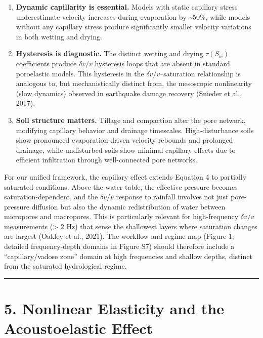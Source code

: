 \documentclass[draft]{agujournal2019}
\begin{document}
\begin{enumerate}
\def\labelenumi{\arabic{enumi}.}
\item
  \textbf{Dynamic capillarity is essential.} Models with static
  capillary stress underestimate velocity increases during evaporation
  by \textasciitilde{}50\%, while models without any capillary stress
  produce significantly smaller velocity variations in both wetting and
  drying.
\item
  \textbf{Hysteresis is diagnostic.} The distinct wetting and drying
  \(\tau(S_w)\) coefficients produce \(\delta v/v\) hysteresis loops
  that are absent in standard poroelastic models. This hysteresis in the
  \(\delta v/v\)--saturation relationship is analogous to, but
  mechanistically distinct from, the mesoscopic nonlinearity (slow
  dynamics) observed in earthquake damage recovery (Snieder et al.,
  2017).
\item
  \textbf{Soil structure matters.} Tillage and compaction alter the pore
  network, modifying capillary behavior and drainage timescales.
  High-disturbance soils show pronounced evaporation-driven velocity
  rebounds and prolonged drainage, while undisturbed soils show minimal
  capillary effects due to efficient infiltration through well-connected
  pore networks.
\end{enumerate}

For our unified framework, the capillary effect extends Equation 4 to
partially saturated conditions. Above the water table, the effective
pressure becomes saturation-dependent, and the \(\delta v/v\) response
to rainfall involves not just pore-pressure diffusion but also the
dynamic redistribution of water between micropores and macropores. This
is particularly relevant for high-frequency \(\delta v/v\) measurements
(\textgreater{} 2 Hz) that sense the shallowest layers where saturation
changes are largest (Oakley et al., 2021). The workflow and regime map
(Figure 1; detailed frequency-depth domains in Figure S7) should
therefore include a ``capillary/vadose zone'' domain at high frequencies
and shallow depths, distinct from the saturated hydrological regime.

\begin{center}\rule{0.5\linewidth}{0.5pt}\end{center}

\section{5. Nonlinear Elasticity and the Acoustoelastic
Effect}\label{nonlinear-elasticity-and-the-acoustoelastic-effect}
\end{document}
